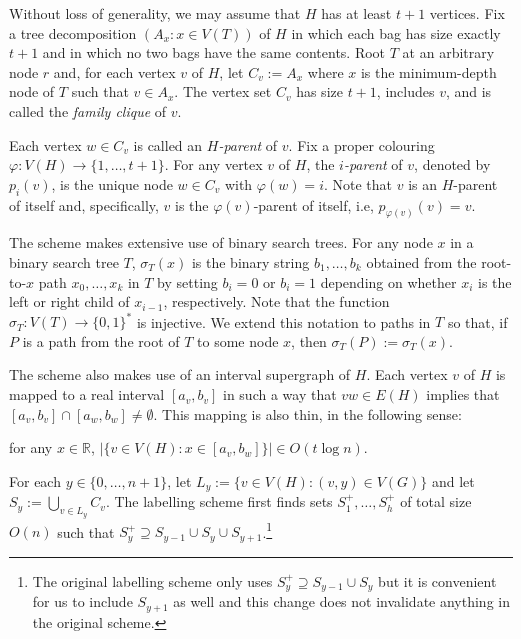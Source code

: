\documentclass{patmorin}
\newcommand{\R}{\mathbb{R}}
\begin{document}
Without loss of generality, we may assume that $H$ has at least $t+1$ vertices. Fix a tree decomposition $(A_{x}:x\in V(T))$ of $H$ in which each bag has size exactly $t+1$ and in which no two bags have the same contents.  Root $T$ at an arbitrary node $r$ and, for each vertex $v$ of $H$, let $C_v:=A_{x}$ where $x$ is the minimum-depth node of $T$ such that $v\in A_{x}$.  The vertex set $C_v$ has size $t+1$, includes $v$, and is called the \emph{family clique} of $v$.

Each vertex $w\in C_v$ is called an \emph{$H$-parent} of $v$.  Fix a proper colouring $\varphi:V(H)\to\{1,\ldots,t+1\}$.  For any vertex $v$ of $H$, the \emph{$i$-parent} of $v$, denoted by $p_i(v)$,  is the unique node $w\in C_v$ with $\varphi(w)=i$.  Note that $v$ is an $H$-parent of itself and, specifically, $v$ is the $\varphi(v)$-parent of itself, i.e, $p_{\varphi(v)}(v)=v$.

The scheme makes extensive use of binary search trees.  For any node $x$ in a binary search tree $T$, $\sigma_T(x)$ is the binary string $b_1,\ldots,b_k$ obtained from the root-to-$x$ path $x_0,\ldots,x_k$ in $T$ by setting $b_i=0$ or $b_i=1$ depending on whether $x_i$ is the left or right child of $x_{i-1}$, respectively. Note that the function $\sigma_T:V(T)\to\{0,1\}^*$ is injective.  We extend this notation to paths in $T$ so that, if $P$ is a path from the root of $T$ to some node $x$, then $\sigma_T(P):=\sigma_T(x)$.

The scheme also makes use of an interval supergraph of $H$.  Each vertex $v$ of $H$ is mapped to a real interval $[a_v,b_v]$ in such a way that $vw\in E(H)$ implies that $[a_v,b_v]\cap [a_w,b_w]\neq\emptyset$.  This mapping is also thin, in the following sense:

\begin{compactenum}[(P1)]
    \item for any $x\in \R$, $|\{v\in V(H): x\in[a_v,b_w]\}|\in O(t\log n)$.\label{thin}
\end{compactenum}

For each $y\in\{0,\ldots,n+1\}$, let $L_y:=\{v\in V(H): (v,y)\in V(G)\}$ and let $S_y:=\bigcup_{v\in L_y}C_v$.  The labelling scheme first finds sets $S^+_1,\ldots,S^+_h$ of total size $O(n)$ such that $S^+_y\supseteq S_{y-1}\cup S_y\cup S_{y+1}$.\footnote{The original labelling scheme only uses $S^+_y\supseteq S_{y-1}\cup S_y$ but it is convenient for us to include $S_{y+1}$ as well and this change does not invalidate anything in the original scheme.}
\end{document}
